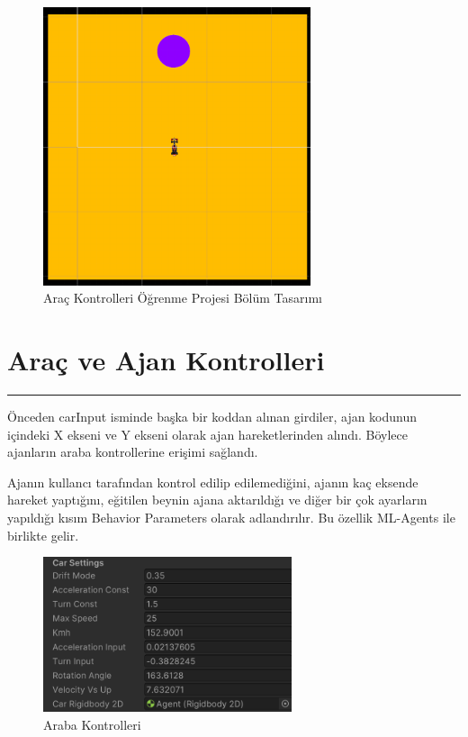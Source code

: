 \documentclass{article}
\begin{document}
\begin{figure}[h]
    \begin{center}
        \includegraphics[width=0.7\textwidth]{tek-map.png}
    \end{center}
      \caption{Araç Kontrolleri Öğrenme Projesi Bölüm Tasarımı}
\end{figure}

\newpage

\section{Araç ve Ajan Kontrolleri}
\rule{\textwidth}{0.5pt}
\par Önceden carInput isminde başka bir koddan alınan girdiler, ajan kodunun içindeki X ekseni ve Y ekseni olarak ajan hareketlerinden alındı. Böylece ajanların araba kontrollerine erişimi sağlandı. 
\newline
\par Ajanın kullancı tarafından kontrol edilip edilemediğini, ajanın kaç eksende hareket yaptığını, eğitilen beynin ajana aktarıldığı ve diğer bir çok ayarların yapıldığı kısım Behavior Parameters olarak adlandırılır. Bu özellik ML-Agents ile birlikte gelir.\\[5pt]


\begin{figure}[h]
    \begin{center}
        \includegraphics[width=0.65\textwidth]{kontrol.png}
    \end{center}
      \caption{Araba Kontrolleri}
\end{figure}
\end{document}

